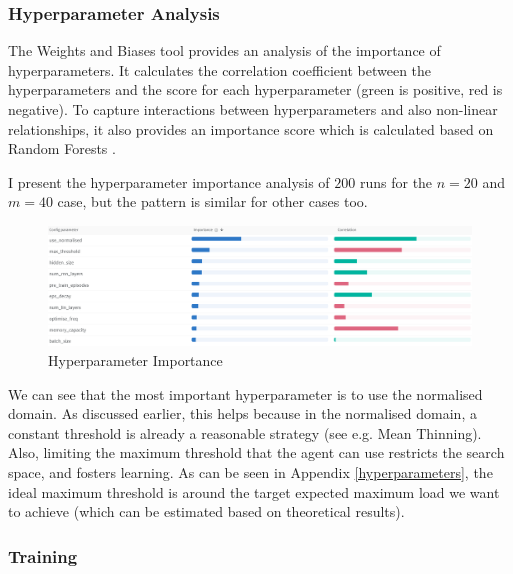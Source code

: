 \subsubsection{Hyperparameter Analysis}



The Weights and Biases tool provides an analysis of the importance of hyperparameters. It calculates the correlation coefficient between the hyperparameters and the score for each hyperparameter (green is positive, red is negative). To capture interactions between hyperparameters and also non-linear relationships, it also provides an importance score which is calculated based on Random Forests \cite{biewald2020wandb}.


I present the hyperparameter importance analysis of $200$ runs for the $n=20$ and $m=40$ case, but the pattern is similar for other cases too.


\begin{figure}[hbt!] \label{two-thinning-hyperparameter-importance}
    \centering
    \includegraphics[scale=0.4]{Chapter4/Figs/Hyperparameter_importance_20_400.png}
    \caption{\TwoThinning Hyperparameter Importance}
\end{figure}


We can see that the most important hyperparameter is to use the normalised domain. As discussed earlier, this helps because in the normalised domain, a constant threshold is already a reasonable strategy (see e.g. Mean Thinning). Also, limiting the maximum threshold that the agent can use restricts the search space, and fosters learning. As can be seen in Appendix \ref{hyperparameters}, the ideal maximum threshold is around the target expected maximum load we want to achieve (which can be estimated based on theoretical results).



\subsubsection{Training}


